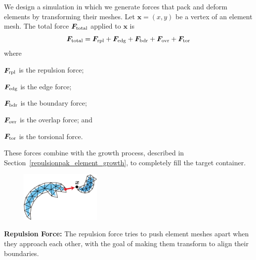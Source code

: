 \newtext
{
We design a simulation in which we generate 
forces that pack and deform elements by transforming their meshes.
Let $\bm{x} = (x, y)$ be a vertex of an element mesh. 
The total force $\bm{F}_\mathrm{total}$ applied to $\bm{x}$ is
\begin{equation}
\bm{F}_\mathrm{total} = \bm{F}_\mathrm{rpl} + \bm{F}_\mathrm{edg} + \bm{F}_\mathrm{bdr} + \bm{F}_\mathrm{ovr} + \bm{F}_\mathrm{tor}
\end{equation}
where 
\begin{packeddescriptions}
	\item[$\bm{F}_\mathrm{rpl}$] is the repulsion force;
	\item[$\bm{F}_\mathrm{edg}$] is the edge force;
	\item[$\bm{F}_\mathrm{bdr}$] is the boundary force;
	\item[$\bm{F}_\mathrm{ovr}$] is the overlap force; and
	\item[$\bm{F}_\mathrm{tor}$] is the torsional force.	
\end{packeddescriptions}
These forces combine with the growth process, described in
Section~\ref{repulsionpak_element_growth}, to completely fill the target container.
}



\bigskip

\begin{figure}
\vspace{-15pt}
    \includegraphics[width=0.35\textwidth]{figures/repulsionpak/repulsion_forces.pdf}
\end{figure}
\textbf{Repulsion Force:} 
The repulsion force tries to push element meshes apart when they approach
each other, with the goal of
making them transform to align their boundaries.
 
